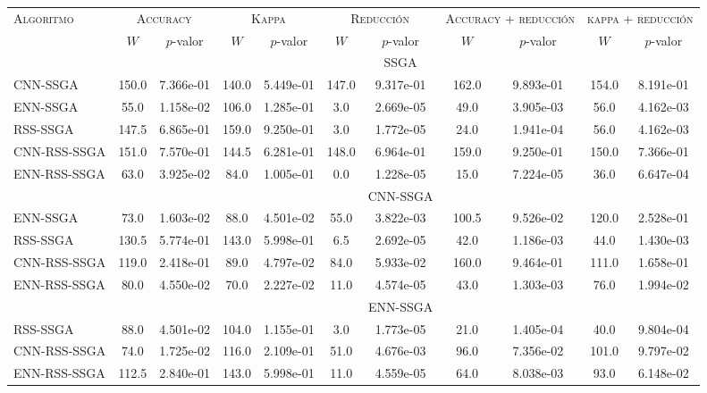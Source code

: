 \begin{table}[]
\centering
\begin{adjustbox}{max width =\textwidth}
\begin{tabular}{l c c c c c c c c c c}
\hline
\multirow{2}{*}{\textsc{Algoritmo}}
	& \multicolumn{2}{c}{\textsc{Accuracy}}
	& \multicolumn{2}{c}{\textsc{Kappa}}
	& \multicolumn{2}{c}{\textsc{Reducción}} 
	& \multicolumn{2}{c}{\textsc{Accuracy + reducción}} 
	& \multicolumn{2}{c}{\textsc{kappa + reducción}} \\
 & $W$ & $p$-valor & $W$ & $p$-valor & $W$ & $p$-valor & $W$ & $p$-valor & $W$ & $p$-valor \\
\hline
\hline

 & & & & & & SSGA & & & & \\

CNN-SSGA  & 150.0 & 7.366e-01 & 140.0 & 5.449e-01 & 147.0 & 9.317e-01 & 162.0 & 9.893e-01 & 154.0 & 8.191e-01 \\ 
ENN-SSGA & 55.0 & 1.158e-02 & 106.0 & 1.285e-01 & 3.0 & 2.669e-05 & 49.0 & 3.905e-03 & 56.0 & 4.162e-03 \\ 
RSS-SSGA  & 147.5 & 6.865e-01 & 159.0 & 9.250e-01 & 3.0 & 1.772e-05 & 24.0 & 1.941e-04 & 56.0 & 4.162e-03 \\ 
CNN-RSS-SSGA  & 151.0 & 7.570e-01 & 144.5 & 6.281e-01 & 148.0 & 6.964e-01 & 159.0 & 9.250e-01 & 150.0 & 7.366e-01 \\ 
ENN-RSS-SSGA & 63.0 & 3.925e-02 & 84.0 & 1.005e-01 & 0.0 & 1.228e-05 & 15.0 & 7.224e-05 & 36.0 & 6.647e-04 \\

\hline

 & & & & & & CNN-SSGA & & & & \\
ENN-SSGA & 73.0 & 1.603e-02 & 88.0 & 4.501e-02 & 55.0 & 3.822e-03 & 100.5 & 9.526e-02 & 120.0 & 2.528e-01 \\ 
RSS-SSGA & 130.5 & 5.774e-01 & 143.0 & 5.998e-01 & 6.5 & 2.692e-05 & 42.0 & 1.186e-03 & 44.0 & 1.430e-03 \\ 
CNN-RSS-SSGA & 119.0 & 2.418e-01 & 89.0 & 4.797e-02 & 84.0 & 5.933e-02 & 160.0 & 9.464e-01 & 111.0 & 1.658e-01 \\ 
ENN-RSS-SSGA& 80.0 & 4.550e-02 & 70.0 & 2.227e-02 & 11.0 & 4.574e-05 & 43.0 & 1.303e-03 & 76.0 & 1.994e-02 \\  

\hline

 & & & & & & ENN-SSGA & & & & \\
RSS-SSGA & 88.0 & 4.501e-02 & 104.0 & 1.155e-01 & 3.0 & 1.773e-05 & 21.0 & 1.405e-04 & 40.0 & 9.804e-04 \\ 
CNN-RSS-SSGA & 74.0 & 1.725e-02 & 116.0 & 2.109e-01 & 51.0 & 4.676e-03 & 96.0 & 7.356e-02 & 101.0 & 9.797e-02 \\ 
ENN-RSS-SSGA& 112.5 & 2.840e-01 & 143.0 & 5.998e-01 & 11.0 & 4.559e-05 & 64.0 & 8.038e-03 & 93.0 & 6.148e-02 \\ 


\end{tabular}
\end{adjustbox}
\end{table}
